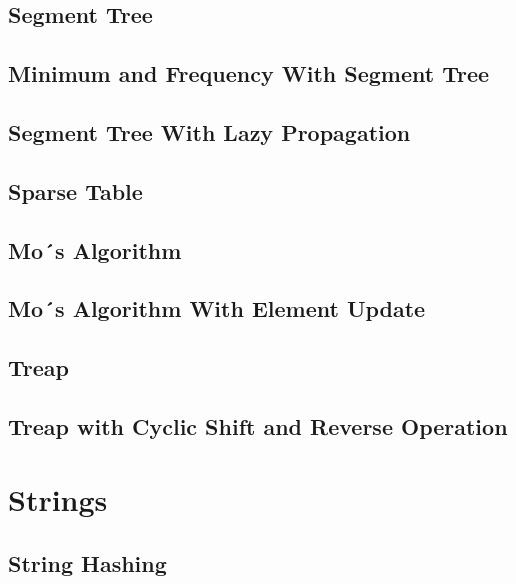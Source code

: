\subsection{Segment Tree}
\raggedbottom
\hrulefill
\subsection{Minimum and Frequency With Segment Tree}
\raggedbottom
\hrulefill
\subsection{Segment Tree With Lazy Propagation}
\raggedbottom
\hrulefill
\subsection{Sparse Table}
\raggedbottom
\hrulefill
\subsection{Mo´s Algorithm}
\raggedbottom
\hrulefill
\subsection{Mo´s Algorithm With Element Update}
\raggedbottom
\hrulefill
\subsection{Treap}
\raggedbottom
\hrulefill
\subsection{Treap with Cyclic Shift and Reverse Operation}
\raggedbottom
\hrulefill

\section{Strings}
\subsection{String Hashing}
\raggedbottom
\hrulefill

